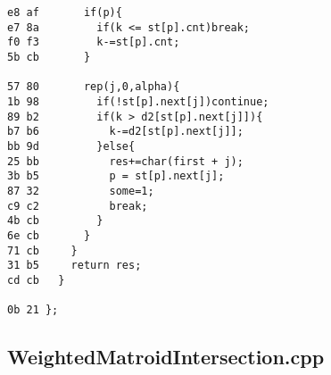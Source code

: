 \documentclass[11pt, a4paper, twoside]{article}
\begin{document}
\begin{lstlisting}
e8 af       if(p){
e7 8a         if(k <= st[p].cnt)break;
f0 f3         k-=st[p].cnt;
5b cb       }
            
57 80       rep(j,0,alpha){
1b 98         if(!st[p].next[j])continue;
89 b2         if(k > d2[st[p].next[j]]){
b7 b6           k-=d2[st[p].next[j]];
bb 9d         }else{
25 bb           res+=char(first + j);
3b b5           p = st[p].next[j];
87 32           some=1;
c9 c2           break;
4b cb         }
6e cb       }
71 cb     }
31 b5     return res;
cd cb   }
      
0b 21 };
\end{lstlisting}

\subsection{WeightedMatroidIntersection.cpp}
\end{document}
